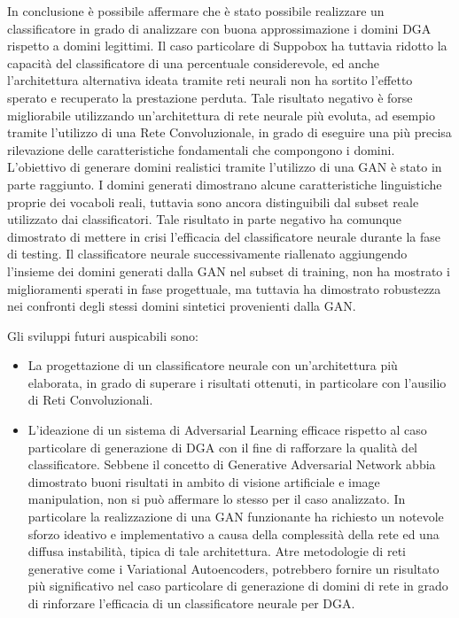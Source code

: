 In conclusione è possibile affermare che è stato possibile realizzare un classificatore in grado di analizzare con buona approssimazione i domini DGA rispetto a domini legittimi. Il caso particolare di Suppobox ha tuttavia ridotto la capacità del classificatore di una percentuale considerevole, ed anche l'architettura alternativa ideata tramite reti neurali non ha sortito l'effetto sperato e recuperato la prestazione perduta. 
Tale risultato negativo è forse migliorabile utilizzando un'architettura di rete neurale più evoluta, ad esempio tramite l'utilizzo di una Rete Convoluzionale, in grado di eseguire una più precisa rilevazione delle caratteristiche fondamentali che compongono i domini. 
L'obiettivo di generare domini realistici tramite l'utilizzo di una GAN è stato in parte raggiunto. I domini generati dimostrano alcune caratteristiche linguistiche proprie dei vocaboli reali,  tuttavia sono ancora distinguibili dal subset reale utilizzato dai classificatori. Tale risultato in parte negativo ha comunque dimostrato di mettere in crisi l'efficacia del classificatore neurale durante la fase di testing. Il classificatore neurale successivamente riallenato aggiungendo l'insieme dei domini generati dalla GAN nel subset di training, non ha mostrato i miglioramenti sperati in fase progettuale, ma tuttavia ha dimostrato robustezza nei confronti degli stessi domini sintetici provenienti dalla GAN.

Gli sviluppi futuri auspicabili sono: 
\begin{itemize}
\item La progettazione di un classificatore neurale con un'architettura più elaborata, in grado di superare i risultati ottenuti, in particolare con l'ausilio di Reti Convoluzionali.
\item L'ideazione di un sistema di Adversarial Learning efficace rispetto al caso particolare di generazione di DGA con il fine di rafforzare la qualità del classificatore. Sebbene il concetto di Generative Adversarial Network abbia dimostrato buoni risultati in ambito di visione artificiale e image manipulation, non si può affermare lo stesso per il caso analizzato. In particolare la realizzazione di una GAN funzionante ha richiesto un notevole sforzo ideativo e implementativo a causa della complessità della rete ed una diffusa instabilità, tipica di tale architettura. Atre metodologie di reti generative come i Variational Autoencoders, potrebbero fornire un risultato più significativo nel caso particolare di generazione di domini di rete in grado di rinforzare l'efficacia di un classificatore neurale per DGA.
\end{itemize}

